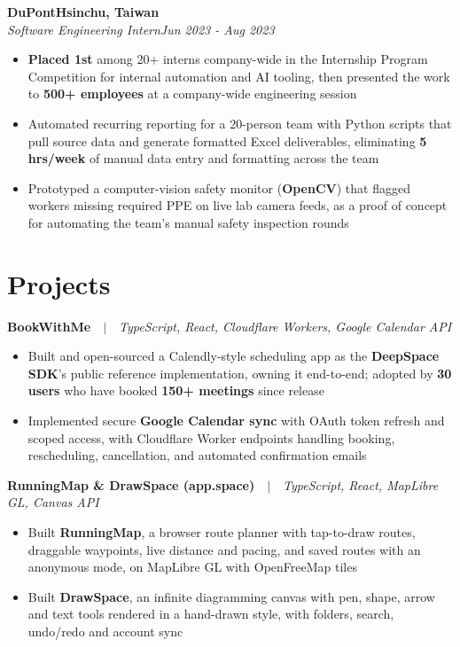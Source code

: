 \documentclass[letterpaper,11pt]{article}
\newcommand{\jobentry}[4]{%
  \textbf{#1}\hfill\textbf{#2}\\
  \textit{#3}\hfill\textit{#4}\par\vspace{1pt}}
\newcommand{\projectentry}[2]{\textbf{#1}\ \ $|$\ \ \textit{#2}\par\vspace{1pt}}
\newcommand{\entrygap}{\vspace{4pt}}
\begin{document}
\jobentry{DuPont}{Hsinchu, Taiwan}{Software Engineering Intern}{Jun 2023 - Aug 2023}
\begin{itemize}
  \item \textbf{Placed 1st} among 20+ interns company-wide in the Internship Program Competition for internal automation and AI tooling, then presented the work to \textbf{500+ employees} at a company-wide engineering session
  \item Automated recurring reporting for a 20-person team with Python scripts that pull source data and generate formatted Excel deliverables, eliminating \textbf{5 hrs/week} of manual data entry and formatting across the team
  \item Prototyped a computer-vision safety monitor (\textbf{OpenCV}) that flagged workers missing required PPE on live lab camera feeds, as a proof of concept for automating the team's manual safety inspection rounds
\end{itemize}

\section{Projects}

\projectentry{BookWithMe}{TypeScript, React, Cloudflare Workers, Google Calendar API}
\begin{itemize}
  \item Built and open-sourced a Calendly-style scheduling app as the \textbf{DeepSpace SDK}'s public reference implementation, owning it end-to-end; adopted by \textbf{30 users} who have booked \textbf{150+ meetings} since release
  \item Implemented secure \textbf{Google Calendar sync} with OAuth token refresh and scoped access, with Cloudflare Worker endpoints handling booking, rescheduling, cancellation, and automated confirmation emails
\end{itemize}
\entrygap

\projectentry{RunningMap \& DrawSpace (app.space)}{TypeScript, React, MapLibre GL, Canvas API}
\begin{itemize}
  \item Built \textbf{RunningMap}, a browser route planner with tap-to-draw routes, draggable waypoints, live distance and pacing, and saved routes with an anonymous mode, on MapLibre GL with OpenFreeMap tiles
  \item Built \textbf{DrawSpace}, an infinite diagramming canvas with pen, shape, arrow and text tools rendered in a hand-drawn style, with folders, search, undo/redo and account sync
\end{itemize}
\end{document}
